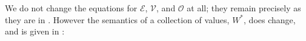 \documentclass[acmsmall,review,dvipsnames]{acmart}
\newcommand{\Value}{W}
\newcommand{\semfun}[1]{\mathcal{#1}}
\newcommand{\semapp}[3]{\semfun{#1}\llbracket #2 \rrbracket\, #3}
\newcommand{\mtype}{\Value^{*}}
\newcommand{\mintersect}{\Cap}
\newcommand{\munion}{\Cup}
\newcommand{\msemi}{\fatsemi}
\newcommand{\wrong}{\mathbf{wrong}}
\begin{document}
We do not change the equations for $\semfun{E}$, $\semfun{V}$, and $\semfun{O}$ at all; they remain
precisely as they are in .
However the semantics of a collection of values, $\mtype$, does change, and is given in :
\end{document}
